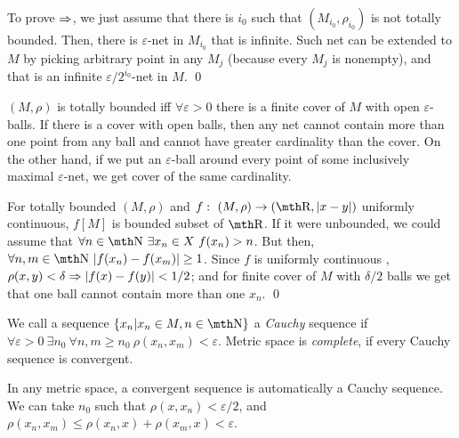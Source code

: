 To prove $\Rightarrow$, we just assume that there is $i_0$ such that 
$(M_{i_0},\rho_{i_0})$ is not totally bounded. Then, there is 
$\varepsilon$-net in $M_{i_0}$ that is infinite. Such net can 
be extended to $M$ by picking arbitrary point in any $M_j$ 
(because every $M_j$ is nonempty), and that is an infinite 
$\varepsilon/2^{i_0}$-net in $M$. 
\qed

\smallskip
$(M,\rho)$ is totally bounded iff $\forall \varepsilon >0$ 
there is a finite cover of $M$ with open $\varepsilon$-balls.
If there is a cover with open balls, then any net cannot contain more 
than one point from any ball and cannot have greater cardinality 
than the cover. On the other hand, if we put an $\varepsilon$-ball 
around every point of some inclusively maximal $\varepsilon$-net, 
we get cover of the same cardinality.

\smallskip
For totally bounded $(M,\rho)$ and $f:\ (M,\rho)\to (\R,|x-y|)$ uniformly 
continuous, $f[M]$ is bounded subset of $\R$. If it were unbounded, 
we could assume that $\forall n\in \N\ \exists x_n\in X\ f(x_n)>n$. 
But then, $\forall n,m\in \N\ |f(x_n)-f(x_m)|\geq 1$. Since $f$ is 
uniformly continuous , $\rho(x,y)< \delta \Rightarrow |f(x)-f(y)|<1/2$; and 
for finite cover of $M$ with $\delta/2$ balls we get that one ball 
cannot contain more than one $x_n$.
\qed

\medskip

 We call a sequence $\{x_n|x_n \in M, n\in \N\}$ 
a {\it Cauchy} sequence if $\forall \varepsilon>0\ \exists n_0\ \forall n,m\geq n_0
\ \rho(x_n,x_m) < \varepsilon$. Metric space is {\it complete}, if every Cauchy 
sequence is convergent. 

In any metric space, a convergent sequence is automatically a Cauchy sequence. 
We can take $n_0$ such that $\rho(x,x_n) < \varepsilon/2$, and $\rho(x_n,x_m) 
\leq \rho(x_n,x) + \rho(x_m,x) < \varepsilon$.


